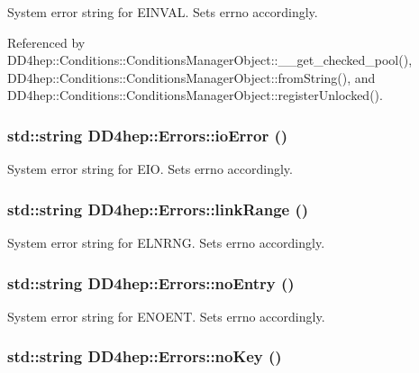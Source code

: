 System error string for EINVAL. Sets errno accordingly. 

Referenced by DD4hep::Conditions::ConditionsManagerObject::\_\-\_\-get\_\-checked\_\-pool(), DD4hep::Conditions::ConditionsManagerObject::fromString(), and DD4hep::Conditions::ConditionsManagerObject::registerUnlocked().\hypertarget{namespace_d_d4hep_1_1_errors_af232117521264a5f6e1211c887e265fd}{
\subsubsection[{ioError}]{\setlength{\rightskip}{0pt plus 5cm}std::string DD4hep::Errors::ioError ()}}
\label{namespace_d_d4hep_1_1_errors_af232117521264a5f6e1211c887e265fd}


System error string for EIO. Sets errno accordingly. \hypertarget{namespace_d_d4hep_1_1_errors_a6e59237308b289629424651a17eb8163}{
\subsubsection[{linkRange}]{\setlength{\rightskip}{0pt plus 5cm}std::string DD4hep::Errors::linkRange ()}}
\label{namespace_d_d4hep_1_1_errors_a6e59237308b289629424651a17eb8163}


System error string for ELNRNG. Sets errno accordingly. \hypertarget{namespace_d_d4hep_1_1_errors_aca021db58d08e5935eea31a7d0b7d1b7}{
\subsubsection[{noEntry}]{\setlength{\rightskip}{0pt plus 5cm}std::string DD4hep::Errors::noEntry ()}}
\label{namespace_d_d4hep_1_1_errors_aca021db58d08e5935eea31a7d0b7d1b7}


System error string for ENOENT. Sets errno accordingly. \hypertarget{namespace_d_d4hep_1_1_errors_ace8817a7446265e17083aa87e73d6019}{
\subsubsection[{noKey}]{\setlength{\rightskip}{0pt plus 5cm}std::string DD4hep::Errors::noKey ()}}
\label{namespace_d_d4hep_1_1_errors_ace8817a7446265e17083aa87e73d6019}


